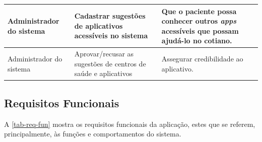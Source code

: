 \begin{table}[htb]
\begin{center}
\begin{tabular}{p{2.0cm}|p{5.0cm}|p{7.0cm}}
            \hline
            Administrador do sistema                                       &
            Cadastrar sugestões de aplicativos acessíveis no sistema       &
            Que o paciente possa conhecer outros \emph{apps} acessíveis que possam ajudá\@-lo no cotiano.                       \\
            \hline
            Administrador do sistema                                       &
            Aprovar/recusar as sugestões de centros de saúde e aplicativos &
            Assegurar credibilidade ao aplicativo.                                                                              \\
        \end{tabular}
    \end{center}
\end{table}

\newpage

\subsection{Requisitos Funcionais}

A \autoref{tab-req-fun} mostra os requisitos funcionais da aplicação, estes que se referem, principalmente, às funções e 
comportamentos do sistema.

